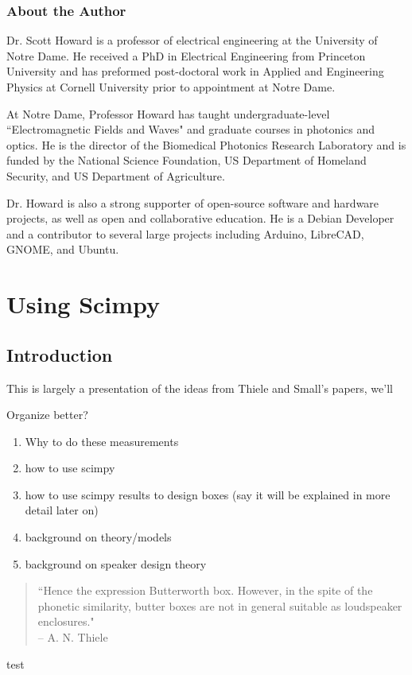 \documentclass[10pt]{book}
\begin{document}
\section*{About the Author}
Dr. Scott Howard is a professor of electrical engineering at the University of Notre Dame. He received a PhD in Electrical Engineering from Princeton University and has preformed post-doctoral work in Applied and Engineering Physics at Cornell University prior to appointment at Notre Dame.

At Notre Dame, Professor Howard has taught undergraduate-level ``Electromagnetic Fields and Waves" and graduate courses in photonics and optics. He is the director of the Biomedical Photonics Research Laboratory and is funded by the National Science Foundation, US Department of Homeland Security, and US Department of Agriculture.

Dr. Howard is also a strong supporter of open-source software and hardware projects, as well as open and collaborative education. He is a Debian Developer and a contributor to several large projects including Arduino, LibreCAD, GNOME, and Ubuntu.


\mainmatter
\part{Using Scimpy}
\chapter{Introduction}

This is largely a presentation of the ideas from Thiele and Small's papers, we'll 

Organize better?
\begin{enumerate}
\item Why to do these measurements
\item how to use scimpy
\item how to use scimpy results to design boxes (say it will be explained in more detail later on)
\item background on theory/models
\item background on speaker design theory
\end{enumerate}

\begin{quote}
``Hence the expression Butterworth box. However, in the spite of the phonetic similarity, butter boxes are not in general suitable as loudspeaker enclosures." \\-- A. N. Thiele
\end{quote}
test
\end{document}
